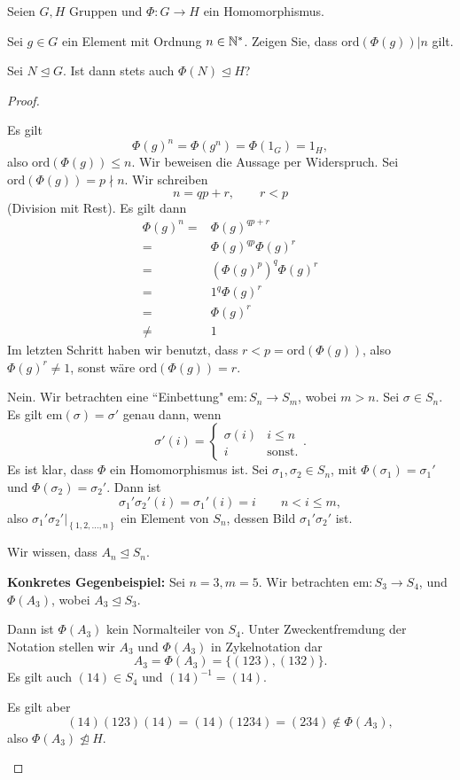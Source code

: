 \begin{Problem}
	Seien $G,H$ Gruppen und $\Phi:G\to H$ ein Homomorphismus.
	\begin{parts}
		\item Sei $g\in G$ ein Element mit Ordnung $n\in \mathbb{N}^*$. Zeigen Sie, dass $\text{ord}(\Phi(g))|n$ gilt.
		\item Sei $N\trianglelefteq G$. Ist dann stets auch $\Phi(N)\trianglelefteq H$?
	\end{parts}
\end{Problem}
\begin{proof}
	\begin{parts}
	\item Es gilt
		\[
		\Phi(g)^n=\Phi(g^n)=\Phi(1_G)=1_H
	,\]
	also $\text{ord}(\Phi(g))\le n$. Wir beweisen die Aussage per Widerspruch. Sei $\text{ord}(\Phi(g))=p\nmid n$. Wir schreiben
	\[
	n=qp+r,\qquad r<p
\]
(Division mit Rest). Es gilt dann
\begin{align*}
	\Phi(g)^n=&\Phi(g)^{qp+r}\\
	=&\Phi(g)^{qp}\Phi(g)^r\\
	=&\left( \Phi(g)^p \right)^q\Phi(g)^r\\
	=&1^q\Phi(g)^r\\
	=&\Phi(g)^r\\
	\neq& 1
\end{align*}
Im letzten Schritt haben wir benutzt, dass $r<p=\text{ord}(\Phi(g))$, also $\Phi(g)^r\neq 1$, sonst wäre $\text{ord}(\Phi(g))=r$.
\item Nein. Wir betrachten eine ``Einbettung" $\text{em}:S_n\to S_m$, wobei $m>n$. Sei $\sigma\in S_n$. Es gilt $\text{em}(\sigma)=\sigma'$ genau dann, wenn
	\[
	\sigma'(i)=\begin{cases}
		\sigma(i) & i\le n\\
		i & \text{sonst.}
	\end{cases}
	.\] 
	Es ist klar, dass $\Phi$ ein Homomorphismus ist. Sei $\sigma_1,\sigma_2\in S_n$, mit $\Phi(\sigma_1)=\sigma_1'$ und $\Phi(\sigma_2)=\sigma_2'$. Dann ist
	\[
	\sigma_1'\sigma_2'(i)=\sigma_1'(i)=i\qquad n < i \le m
,\]
also $\sigma_1'\sigma_2'|_{\left\{ 1,2,\dots, n \right\} }$ ein Element von $S_n$, dessen Bild $\sigma_1'\sigma_2'$ ist.

Wir wissen, dass $A_n\trianglelefteq S_n$. 

\textbf{Konkretes Gegenbeispiel:} Sei $n=3,m=5$. Wir betrachten $\text{em}:S_3\to S_4$, und $\Phi(A_3)$, wobei $A_3\trianglelefteq S_3$.

Dann ist $\Phi(A_3)$ kein Normalteiler von $S_4$. Unter Zweckentfremdung der Notation stellen wir $A_3$ und $\Phi(A_3)$ in Zykelnotation dar
\[
	A_3=\Phi(A_3)=\{(123), (132)\}
	.\]
Es gilt auch $(14)\in S_4$ und $(14)^{-1}=(14)$.

Es gilt aber
\[
	(14)(123)(14)=(14)(1234)=(234)\not\in  \Phi(A_3)
,\] 
also $\Phi(A_3)\not\trianglelefteq H$.\qedhere
	\end{parts}
\end{proof}
